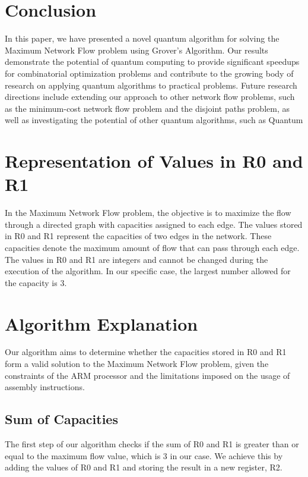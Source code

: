 \section{Conclusion}\label{sec:conclusion}
In this paper, we have presented a novel quantum algorithm for solving the Maximum Network Flow problem using Grover's Algorithm. Our results demonstrate the potential of quantum computing to provide significant speedups for combinatorial optimization problems and contribute to the growing body of research on applying quantum algorithms to practical problems. Future research directions include extending our approach to other network flow problems, such as the minimum-cost network flow problem and the disjoint paths problem, as well as investigating the potential of other quantum algorithms, such as Quantum

\section{Representation of Values in R0 and R1}

In the Maximum Network Flow problem, the objective is to maximize the flow through a directed graph with capacities assigned to each edge. The values stored in R0 and R1 represent the capacities of two edges in the network. These capacities denote the maximum amount of flow that can pass through each edge. The values in R0 and R1 are integers and cannot be changed during the execution of the algorithm. In our specific case, the largest number allowed for the capacity is 3.

\section{Algorithm Explanation}

Our algorithm aims to determine whether the capacities stored in R0 and R1 form a valid solution to the Maximum Network Flow problem, given the constraints of the ARM processor and the limitations imposed on the usage of assembly instructions.

\subsection{Sum of Capacities}

The first step of our algorithm checks if the sum of R0 and R1 is greater than or equal to the maximum flow value, which is 3 in our case. We achieve this by adding the values of R0 and R1 and storing the result in a new register, R2.

